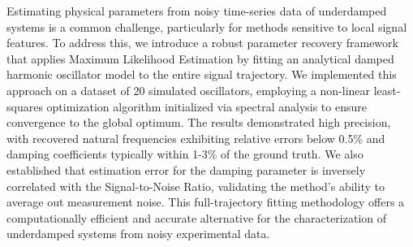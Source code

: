 \documentclass[]{article}
\begin{document}
Estimating physical parameters from noisy time-series data of underdamped systems is a common challenge, particularly for methods sensitive to local signal features. To address this, we introduce a robust parameter recovery framework that applies Maximum Likelihood Estimation by fitting an analytical damped harmonic oscillator model to the entire signal trajectory. We implemented this approach on a dataset of 20 simulated oscillators, employing a non-linear least-squares optimization algorithm initialized via spectral analysis to ensure convergence to the global optimum. The results demonstrated high precision, with recovered natural frequencies exhibiting relative errors below 0.5\% and damping coefficients typically within 1-3\% of the ground truth. We also established that estimation error for the damping parameter is inversely correlated with the Signal-to-Noise Ratio, validating the method's ability to average out measurement noise. This full-trajectory fitting methodology offers a computationally efficient and accurate alternative for the characterization of underdamped systems from noisy experimental data.
\end{document}
